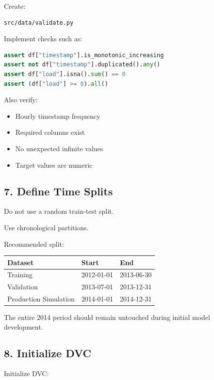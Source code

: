 \documentclass[11pt,a4paper]{article}
\begin{document}
Create:

\begin{lstlisting}
src/data/validate.py
\end{lstlisting}

Implement checks such as:

\begin{lstlisting}[language=Python]
assert df["timestamp"].is_monotonic_increasing
assert not df["timestamp"].duplicated().any()
assert df["load"].isna().sum() == 0
assert (df["load"] >= 0).all()
\end{lstlisting}

Also verify:

\begin{itemize}
    \item Hourly timestamp frequency
    \item Required columns exist
    \item No unexpected infinite values
    \item Target values are numeric
\end{itemize}

\subsection{7. Define Time Splits}

Do not use a random train-test split.

Use chronological partitions.

Recommended split:

\begin{table}[h]
\centering
\begin{tabular}{lll}
\toprule
Dataset & Start & End \\
\midrule
Training & 2012-01-01 & 2013-06-30 \\
Validation & 2013-07-01 & 2013-12-31 \\
Production Simulation & 2014-01-01 & 2014-12-31 \\
\bottomrule
\end{tabular}
\end{table}

The entire 2014 period should remain untouched during initial model development.

\subsection{8. Initialize DVC}

Initialize DVC:
\end{document}
